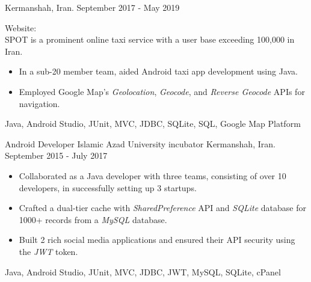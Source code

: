 \begin{experiences}
  {Kermanshah, Iran. \hspace{140 pt} September 2017 - May 2019}
  {}
  {
  Website: \\
  SPOT is a prominent online taxi service with a user base exceeding 100,000 in Iran. 
  \begin{itemize}
    \item In a sub-20 member team, aided Android taxi app development using Java.
    \item Employed Google Map's \emph{Geolocation}, \emph{Geocode}, and \emph{Reverse Geocode} APIs for navigation.\end{itemize}
  }{Java, Android Studio, JUnit, MVC, JDBC, SQLite, SQL, Google Map Platform}

\emptySeparator

\experience
{}
{Android Developer}
{Islamic Azad University incubator}
{Kermanshah, Iran. \hspace{60 pt} September 2015 - July 2017}
{}
{
\begin{itemize}
\item Collaborated as a Java developer with three teams, consisting of over 10 developers, in successfully setting up 3 startups.
\item Crafted a dual-tier cache with \emph{SharedPreference} API and \emph{SQLite} database for 1000+ records from a \emph{MySQL} database.
\item Built 2 rich social media applications and ensured their API security using the \emph{JWT} token.
\end{itemize}
}{Java, Android Studio, JUnit, MVC, JDBC, JWT, MySQL, SQLite, cPanel}
\end{experiences}